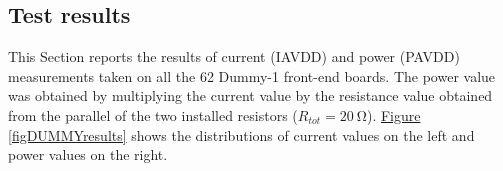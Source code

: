 \begin{table}[h!]
    \centering
    \def\arraystretch{1.3}
    \caption{Structure of the entry for the Dummy-1 front-end boards test report.}
    \label{tabDUMMYstruct}
\end{table}


\subsection{Test results}
This Section reports the results of current (IAVDD) and power (PAVDD) measurements taken on all the 62 Dummy-1 front-end boards. The power value was obtained by multiplying the current value by the resistance value obtained from the parallel of the two installed resistors ($R_{tot} = \SI{20}{\ohm}$). \hyperref[figDUMMYresults]{Figure \ref{figDUMMYresults}} shows the distributions of current values on the left and power values on the right.

